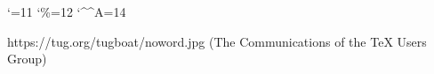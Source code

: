 
\def\markdownOptionContentBlocks{true}

\begingroup
\catcode`\@=11
\catcode`\%=12
\catcode`\^^A=14
\global\def\markdownRendererImage#1#2#3#4{^^A
\immediate\write18{^^A
  if printf '%
    OUTPUT="$(printf '%
              cut -d' ' -f1).^^A
            $(printf '%
              sed 's/.*[.]//')";
    if ! [ -e "$OUTPUT" ]; then
      wget -O "$OUTPUT" '#3' || rm "$OUTPUT";
      convert "$OUTPUT" png:"$OUTPUT";
    fi;
    printf '%
  else
    printf '%
  fi}^^A
{\everyeof={\noexpand}^^A
\edef\filename{\@@input"\jobname.fetched" }^^A
\texttt{[image: \\filename]}\par #4}}
\endgroup

\markdownBegin
https://tug.org/tugboat/noword.jpg
(The Communications of the TeX Users Group)
\markdownEnd

\bye
